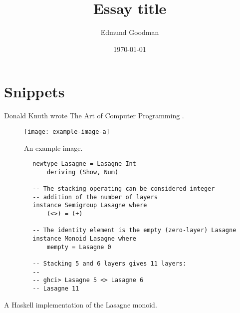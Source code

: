 \documentclass[12pt]{article}
\title{Essay title}
\author{Edmund Goodman}
\date{\today}
\begin{document}
\maketitle



\section{Snippets}
\label{sec:snippets}

Donald Knuth wrote The Art of Computer Programming \cite{knuth1997art}.

\begin{figure}[H]
    \centering
    \texttt{[image: example-image-a]}
    \caption{An example image.}
    \label{fig:example-image-a}
\end{figure}

\begin{listing}[H]
    \begin{verbatim}
        newtype Lasagne = Lasagne Int
            deriving (Show, Num)
        
        -- The stacking operating can be considered integer 
        -- addition of the number of layers
        instance Semigroup Lasagne where
            (<>) = (+)
        
        -- The identity element is the empty (zero-layer) Lasagne
        instance Monoid Lasagne where
            mempty = Lasagne 0
        
        -- Stacking 5 and 6 layers gives 11 layers:
        --
        -- ghci> Lasagne 5 <> Lasagne 6
        -- Lasagne 11
    \end{verbatim}
    \caption{A Haskell implementation of the Lasagne monoid.}
    \label{listing:haskell-lasagne-monoid}
\end{listing}



\printbibliography[heading=bibnumbered]
\appendix
\end{document}
